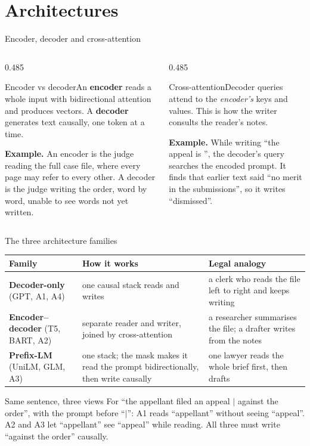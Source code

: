 \documentclass[aspectratio=169,11pt]{beamer}
\newcommand{\term}[3]{%
  \begin{block}{#1}\small #2\par\vspace{1mm}%
  {\color{exgreen}\textbf{Example.}} #3\end{block}}
\newcommand{\twoterms}[6]{%
  \begin{columns}[T]
    \begin{column}{0.485\textwidth}\term{#1}{#2}{#3}\end{column}
    \begin{column}{0.485\textwidth}\term{#4}{#5}{#6}\end{column}
  \end{columns}}
\begin{document}
\section{Architectures}

\begin{frame}{Encoder, decoder and cross-attention}
  \twoterms{Encoder vs decoder}
  {An \textbf{encoder} reads a whole input with bidirectional attention and produces vectors. A \textbf{decoder} generates text causally, one token at a time.}
  {An encoder is the judge reading the full case file, where every page may refer to every other. A decoder is the judge writing the order, word by word, unable to see words not yet written.}
  {Cross-attention}
  {Decoder queries attend to the \emph{encoder's} keys and values. This is how the writer consults the reader's notes.}
  {While writing ``the appeal is \underline{\hspace{8mm}}'', the decoder's query searches the encoded prompt. It finds that earlier text said ``no merit in the submissions'', so it writes ``dismissed''.}
\end{frame}

\begin{frame}{The three architecture families}
  \small
  \begin{tabularx}{\textwidth}{@{}l X X@{}}
    \toprule
    Family & How it works & Legal analogy\\
    \midrule
    \textbf{Decoder-only} (GPT, A1, A4) & one causal stack reads and writes & a clerk who reads the file left to right and keeps writing\\
    \textbf{Encoder--decoder} (T5, BART, A2) & separate reader and writer, joined by cross-attention & a researcher summarises the file; a drafter writes from the notes\\
    \textbf{Prefix-LM} (UniLM, GLM, A3) & one stack; the mask makes it read the prompt bidirectionally, then write causally & one lawyer reads the whole brief first, then drafts\\
    \bottomrule
  \end{tabularx}
  \vspace{2mm}
  \begin{exampleblock}{Same sentence, three views}
    \small
    For ``the appellant filed an appeal $|$ against the order'', with the prompt before ``$|$'':
    A1 reads ``appellant'' without seeing ``appeal''.
    A2 and A3 let ``appellant'' see ``appeal'' while reading.
    All three must write ``against the order'' causally.
  \end{exampleblock}
\end{frame}
\end{document}
